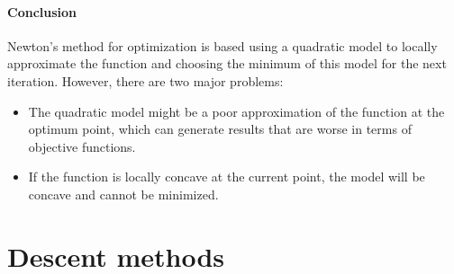 \paragraph{Conclusion} Newton's method for optimization is based using a quadratic model to locally approximate the function and choosing the minimum of this model for the next iteration. However, there are two major problems:
\begin{itemize}
    \item The quadratic model might be a poor approximation of the function at the optimum point, which can generate results that are worse in terms of objective functions.
    \item If the function is locally concave at the current point, the model will be concave and cannot be minimized.
\end{itemize}


\section{Descent methods}


